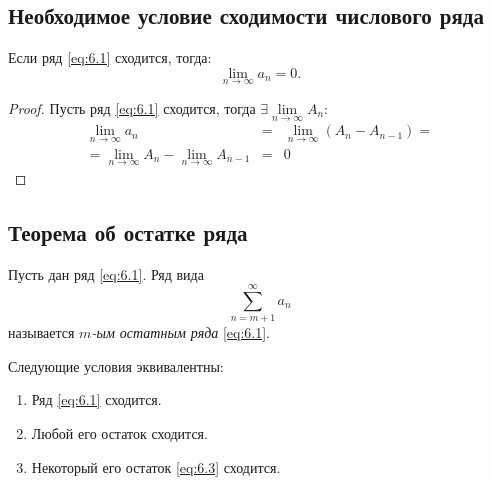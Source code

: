 \subsection{Необходимое условие сходимости числового ряда}

\begin{theorem}
    Если ряд \ref{eq:6.1} сходится, тогда:
    \[
        \underset{n\rightarrow\infty}{\lim}a_n = 0.
    \]
\end{theorem}

\begin{proof}
    Пусть ряд \ref{eq:6.1} сходится, тогда $\exists \underset{n\rightarrow\infty}{\lim}A_n$:
    \begin{eqnarray*}
        \underset{n\rightarrow\infty}{\lim}a_n &=& \underset{n\rightarrow\infty}{\lim}(A_n - A_{n-1}) = \\
        = \underset{n\rightarrow\infty}{\lim}A_n - \underset{n\rightarrow\infty}{\lim}A_{n-1} &=& 0
    \end{eqnarray*}
\end{proof}

\subsection{Теорема об остатке ряда}

\begin{definition}
    Пусть дан ряд \ref{eq:6.1}. Ряд вида
    \begin{equation}\label{eq:6.3}
        \sum_{n=m+1}^{\infty}a_n
    \end{equation}
    называется \emph{$ m $-ым остатным ряда} \ref{eq:6.1}.
\end{definition}

\begin{theorem}
    Следующие условия эквивалентны:
    \begin{enumerate}
        \item Ряд \ref{eq:6.1} сходится.
        \item Любой его остаток сходится.
        \item Некоторый его остаток \ref{eq:6.3} сходится.
    \end{enumerate}
\end{theorem}


